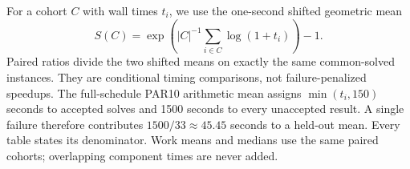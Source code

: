 For a cohort $C$ with wall times $t_i$, we use the one-second shifted geometric mean
\[
 S(C)=\exp\!\left(|C|^{-1}\sum_{i\in C}\log(1+t_i)\right)-1.
\]
Paired ratios divide the two shifted means on exactly the same common-solved instances. They are conditional timing comparisons, not failure-penalized speedups. The full-schedule PAR10 arithmetic mean assigns $\min(t_i,150)$ seconds to accepted solves and 1500 seconds to every unaccepted result. A single failure therefore contributes $1500/33\approx45.45$ seconds to a held-out mean. Every table states its denominator. Work means and medians use the same paired cohorts; overlapping component times are never added.
